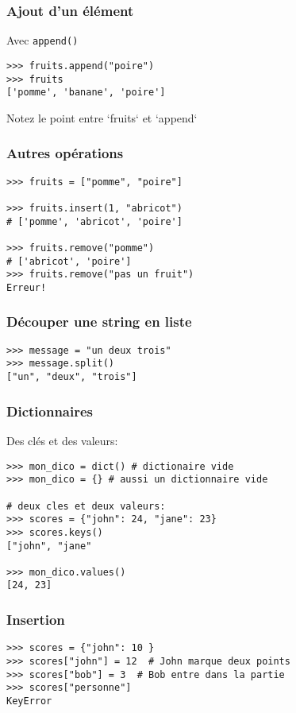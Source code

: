 \documentclass{beamer}
\begin{document}
\begin{frame}[fragile]
  \frametitle{Ajout d'un élément}
Avec \texttt{append()}

\begin{lstlisting}
>>> fruits.append("poire")
>>> fruits
['pomme', 'banane', 'poire']
\end{lstlisting}

\vfill

Notez le point entre `fruits` et `append`
\end{frame}


\begin{frame}[fragile]
  \frametitle{Autres opérations}

\begin{lstlisting}
>>> fruits = ["pomme", "poire"]

>>> fruits.insert(1, "abricot")
# ['pomme', 'abricot', 'poire']

>>> fruits.remove("pomme")
# ['abricot', 'poire']
>>> fruits.remove("pas un fruit")
Erreur!
\end{lstlisting}

\end{frame}

\begin{frame}[fragile]
  \frametitle{Découper une string en liste}

\begin{lstlisting}
>>> message = "un deux trois"
>>> message.split()
["un", "deux", "trois"]
\end{lstlisting}
\end{frame}


\begin{frame}[fragile]
  \frametitle{Dictionnaires}

Des clés et des valeurs:

\begin{lstlisting}
>>> mon_dico = dict() # dictionaire vide
>>> mon_dico = {} # aussi un dictionnaire vide

# deux cles et deux valeurs:
>>> scores = {"john": 24, "jane": 23}
>>> scores.keys()
["john", "jane"

>>> mon_dico.values()
[24, 23]
\end{lstlisting}

\end{frame}

\begin{frame}[fragile]
  \frametitle{Insertion}
\begin{lstlisting}
>>> scores = {"john": 10 }
>>> scores["john"] = 12  # John marque deux points
>>> scores["bob"] = 3  # Bob entre dans la partie
>>> scores["personne"]
KeyError
\end{lstlisting}
\end{frame}
\end{document}
